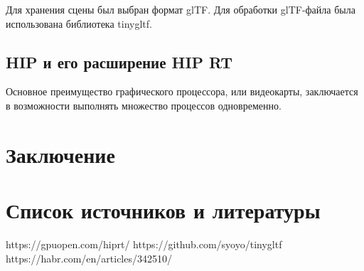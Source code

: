 \documentclass[a4paper,14pt]{extarticle}
\begin{document}
Для хранения сцены был выбран формат glTF. Для обработки glTF-файла была использована библиотека tinygltf. 
\subsection{HIP и его расширение HIP RT}
Основное преимущество графического процессора, или видеокарты, заключается в 
возможности выполнять множество процессов одновременно.  
\section{Заключение}
\section{Список источников и литературы}

https://gpuopen.com/hiprt/
https://github.com/syoyo/tinygltf
https://habr.com/en/articles/342510/
\end{document}
